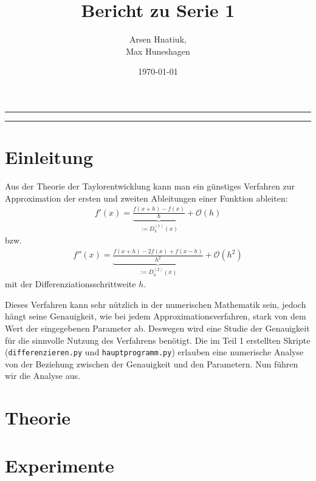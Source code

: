 \documentclass[smallheadings]{scrartcl}
\title{Bericht zu Serie 1}
\author{%
  Arsen Hnatiuk,\\%
  Max Huneshagen 
}
\date{\today}
\begin{document}
\maketitle
\tableofcontents
\bigskip

\hrule
\hrule


\section{Einleitung}
Aus der Theorie der Taylorentwicklung kann man ein günstiges Verfahren zur Approximation der ersten und zweiten Ableitungen einer Funktion ableiten: 
\begin{align}
\label{eq:1_abl}
f'(x)=\underbrace{\frac{f(x+h)-f(x)}{h}}_{:=D_h^{(1)}(x)}+\mathcal{O}(h)
\end{align}
bzw.
\begin{align}
\label{eq:2_abl}
f''(x)=\underbrace{\frac{f(x+h)-2f(x)+f(x-h)}{h^2}}_{:=D_h^{(2)}(x)}+\mathcal{O}(h^2)
\end{align}
mit der Differenziationsschrittweite $h$.

Dieses Verfahren kann sehr nützlich in der numerischen Mathematik sein, jedoch hängt seine Genauigkeit, wie bei jedem Approximationsverfahren, stark von dem Wert der eingegebenen Parameter ab. Deswegen wird eine Studie der Genauigkeit für die sinnvolle Nutzung des Verfahrens benötigt. Die im Teil 1 erstellten Skripte (\texttt{differenzieren.py} und \texttt{hauptprogramm.py}) erlauben eine numerische Analyse von der Beziehung zwischen der Genauigkeit und den Parametern. Nun führen wir die Analyse aus.

\section{Theorie}

\section{Experimente}
\end{document}
